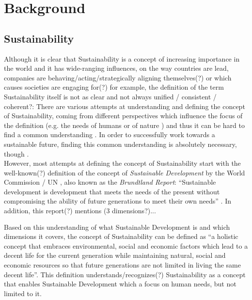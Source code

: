 \chapter{Background} %
\section{Sustainability}
Although it is clear that Sustainability is a concept of increasing importance in the world and it has wide-ranging influences, on the way countries are lead, companies are behaving/acting/strategically aligning themselves(?) or which causes societies are engaging for(?) for example, the definition of the term Sustainability itself is not as clear and not always unified / consistent / coherent?: %
There are various attempts at understanding and defining the concept of Sustainability, coming from different perspectives which influence the focus of the definition (e.g. the needs of humans or of nature \cite{gladwin_shifting_1995}) and thus it can be hard to find a common understanding \cite{jamieson_sustainability_1998}%
. In order to successfully work towards a sustainable future, finding this common understanding is absolutely necessary, though \cite{jamieson_sustainability_1998}.\\

However, most attempts at defining the concept of Sustainability start with the well-known(?) definition of the concept of \textit{Sustainable Development} by the World Commission / UN %
, also known as the \textit{Brundtland Report}: "`Sustainable development is development that meets the needs of the present without compromising the ability of future generations to meet their own needs"'\cite{Brundtland1987} %
. In addition, this report(?) mentions (3 dimensions?)...

Based on this understanding of what Sustainable Development is and which dimensions it covers, the concept of Sustainability can be defined as "`a holistic concept that embraces environmental, social and economic factors which lead to a decent life for the current generation while maintaining natural, social and economic resources so that future generations are not limited in living the same decent life"'.%
This definition understands/recognizes(?) Sustainability as a concept that enables Sustainable Development which a focus on human needs, but not limited to it.

